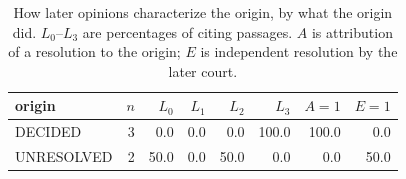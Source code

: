 \begin{table}[t]
\centering\small
\begin{tabular}{lrrrrrrr}
\toprule
origin & $n$ & $L_0$ & $L_1$ & $L_2$ & $L_3$ & $A{=}1$ & $E{=}1$ \\
\midrule
DECIDED & 3 & 0.0 & 0.0 & 0.0 & 100.0 & 100.0 & 0.0 \\
UNRESOLVED & 2 & 50.0 & 0.0 & 50.0 & 0.0 & 0.0 & 50.0 \\
\bottomrule
\end{tabular}
\caption{How later opinions characterize the origin, by what the origin did. $L_0$--$L_3$ are percentages of citing passages. $A$ is attribution of a resolution to the origin; $E$ is independent resolution by the later court.}
\label{tab:layer2}
\end{table}
